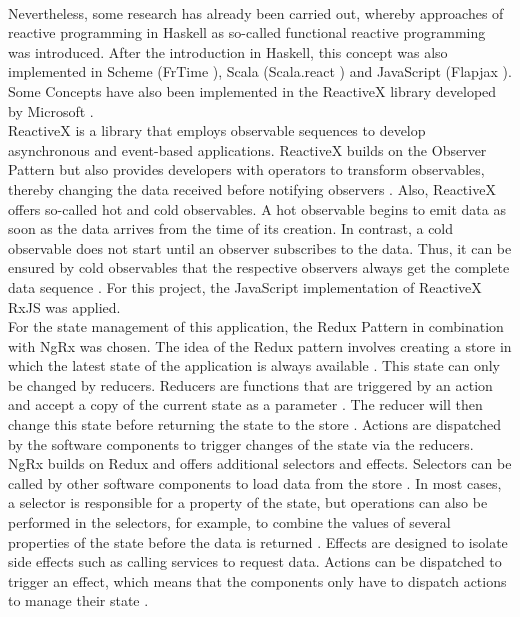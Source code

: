 \documentclass[Bachelor,BIF,english]{twbook}
\begin{document}
\\[\baselineskip]
Nevertheless, some research has already been carried out, whereby approaches of reactive programming in Haskell \cite{Haskell} as so-called functional reactive programming was introduced. After the introduction in Haskell, this concept was also implemented in Scheme (FrTime \cite{FrTime}), Scala (Scala.react \cite{DeprecatingOP}) and JavaScript (Flapjax \cite{Flapjax}). Some Concepts have also been implemented in the ReactiveX \cite{ReactiveX} library developed by Microsoft \cite[p.~954]{RPWalkthrough} \cite[p.~796]{DebuggingRP} \cite[p.~2]{PositivEffectOfRP}.
\\[\baselineskip]
ReactiveX is a library that employs observable sequences to develop asynchronous and event-based applications. ReactiveX builds on the Observer Pattern but also provides developers with operators to transform observables, thereby changing the data received before notifying observers \cite{ReactiveXIntro}. Also, ReactiveX offers so-called hot and cold observables. A hot observable begins to emit data as soon as the data arrives from the time of its creation. In contrast, a cold observable does not start until an observer subscribes to the data. Thus, it can be ensured by cold observables that the respective observers always get the complete data sequence \cite{RxObservables}. For this project, the JavaScript implementation of ReactiveX RxJS \cite{RxJS} was applied.
\\[\baselineskip]
For the state management of this application, the Redux Pattern \cite{Redux} in combination with NgRx \cite{Ngrx} was chosen. The idea of the Redux pattern involves creating a store in which the latest state of the application is always available \cite{ReduxIntroCC}. This state can only be changed by reducers. Reducers are functions that are triggered by an action and accept a copy of the current state as a parameter \cite{ReduxIntroCC}. The reducer will then change this state before returning the state to the store \cite{ReduxIntroCC}. Actions are dispatched by the software components to trigger changes of the state via the reducers. 
\\[\baselineskip]
NgRx builds on Redux and offers additional selectors and effects. Selectors can be called by other software components to load data from the store \cite{NgrxSelector}. In most cases, a selector is responsible for a property of the state, but operations can also be performed in the selectors, for example, to combine the values of several properties of the state before the data is returned \cite{NgrxSelector}. Effects are designed to isolate side effects such as calling services to request data. Actions can be dispatched to trigger an effect, which means that the components only have to dispatch actions to manage their state \cite{NgrxEffect}.
\end{document}
